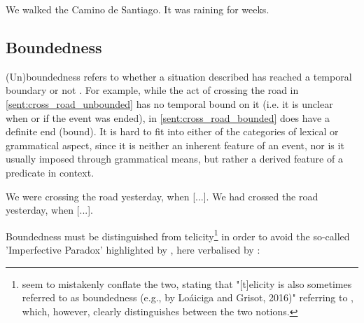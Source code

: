 \begin{exe}
    \ex We walked the Camino de Santiago.
    \label{sent:walk_camino_santiago}
    \ex It was raining for weeks.
    \label{sent:raining_for_weeks}
\end{exe}

\subsection{Boundedness}
\label{sect:boundedness}
(Un)boundedness refers to whether a situation described has reached a temporal boundary or not \citep{6608d9d0-a477-39af-8491-2172df5ae612}. For example, while the act of crossing the road in \ref{sent:cross_road_unbounded} has no temporal bound on it (i.e. it is unclear when or if the event was ended), in \ref{sent:cross_road_bounded} does have a definite end (bound). It is hard to fit into either of the categories of lexical or grammatical aspect, since it is neither an inherent feature of an event, nor is it usually imposed through grammatical means, but rather a derived feature of a predicate in context.

\begin{exe}
    \ex We were crossing the road yesterday, when [...].
    \label{sent:cross_road_unbounded}
    \ex We had crossed the road yesterday, when [...].
    \label{sent:cross_road_bounded}
\end{exe}
Boundedness must be distinguished from telicity\footnote{\citet{friedrich-etal-2023-kind} seem to mistakenly conflate the two, stating that "[t]elicity is also sometimes referred to as boundedness (e.g., by Loáiciga and Grisot, 2016)" referring to \citet{loaiciga-grisot-2016-predicting}, which, however, clearly distinguishes between the two notions.} in order to avoid the so-called 'Imperfective Paradox' highlighted by \citet{dowty2012word}, here verbalised by \citet{zucchi}:

